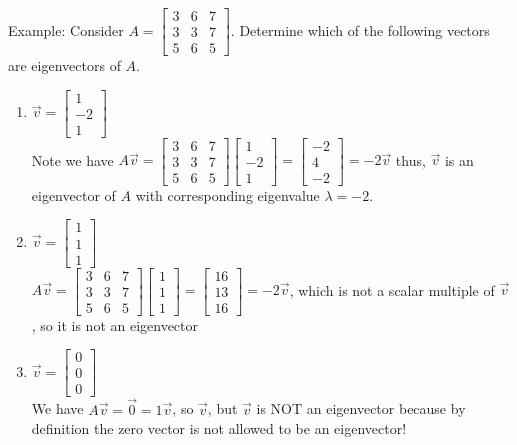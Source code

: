 \documentclass[10pt,letter]{article}
\begin{document}
Example: Consider $A= \begin{bmatrix}3&6&7\\3&3&7\\5&6&5\end{bmatrix}$. Determine which of the following vectors are eigenvectors of $A$. \begin{enumerate}
    \item $\vec{v}=\begin{bmatrix}1\\-2\\1\end{bmatrix}$\\ Note we have $A\vec{v}=\begin{bmatrix}3&6&7\\3&3&7\\5&6&5\end{bmatrix}\begin{bmatrix}1\\-2\\1\end{bmatrix}=\begin{bmatrix}-2\\4\\-2\end{bmatrix}=-2\vec{v}$ thus, $\vec{v}$ is an eigenvector of $A$ with corresponding eigenvalue $\lambda=-2$. 
    \item $\vec{v}=\begin{bmatrix}1\\1\\1\end{bmatrix}$\\ $A\vec{v}=\begin{bmatrix}3&6&7\\3&3&7\\5&6&5\end{bmatrix}\begin{bmatrix}1\\1\\1\end{bmatrix}=\begin{bmatrix}16\\13\\16\end{bmatrix}=-2\vec{v}$, which is not a scalar multiple of $\vec{v}$, so it is not an eigenvector 
    \item $\vec{v}=\begin{bmatrix}0\\0\\0\end{bmatrix}$ \\ We have $A\vec{v}=\vec{0}=1\vec{v}$, so $\vec{v}$, but $\vec{v}$ is NOT an eigenvector because by definition the zero vector is not allowed to be an eigenvector! 
\end{enumerate}
\end{document}
